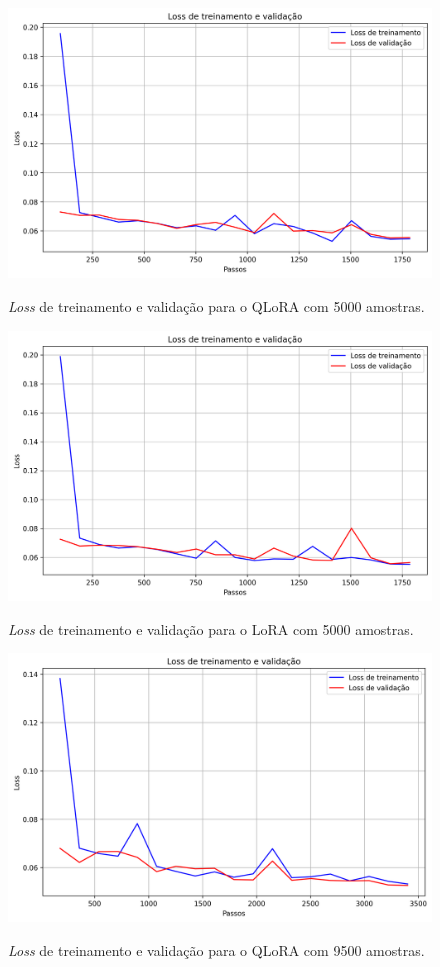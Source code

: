 \begin{figure}[ht]
    \centering
    \caption{\small \textit{Loss} de treinamento e validação para o \ac{QLoRA} com 5000 amostras.}
    \includegraphics[width=0.725\columnwidth,keepaspectratio]{images/loss_qlora_5000.png}
    \label{fig:loss_qlora_5000}
\end{figure}

\clearpage

\begin{figure}[ht]
    \centering
    \caption{\small \textit{Loss} de treinamento e validação para o \ac{LoRA} com 5000 amostras.}
    \includegraphics[width=0.725\columnwidth,keepaspectratio]{images/loss_lora_5000.png}
    \label{fig:loss_lora_5000}
\end{figure}

\begin{figure}[ht]
    \centering
    \caption{\small \textit{Loss} de treinamento e validação para o \ac{QLoRA} com 9500 amostras.}
    \includegraphics[width=0.725\columnwidth,keepaspectratio]{images/loss_qlora_9500.png}
    \label{fig:loss_qlora_9500}
\end{figure}

